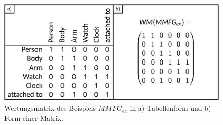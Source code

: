 %
\begin{figure}[htb]
    \centering
    \includegraphics[width=\textwidth]{chapter/chapter_2/valuation-matrix-a-b.eps}
    \caption{Wertungsmatrix des Beispiels $MMFG_{ex}$ in a) Tabellenform und b) Form einer Matrix.}
    \label{sec2:sota:subsec:fz-explainablity:fig:mmfg-valuation-matrix}
\end{figure}

